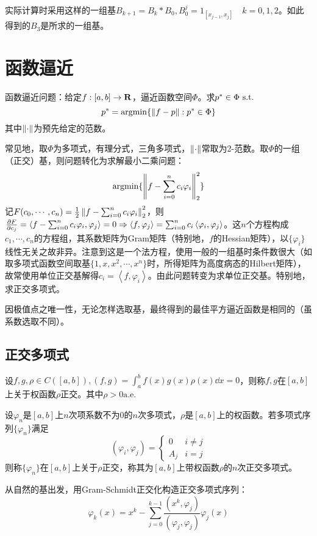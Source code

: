 \documentclass{ctexart}
\begin{document}
实际计算时采用这样的一组基$B_{k+1}=B_k*B_0,B_0^j=1_{[x_{j-1},x_j]}\quad k=0,1,2$。如此得到的$B_3$是所求的一组基。

\section{函数逼近}
函数逼近问题：给定$f:[a,b]\to\mathbf{R}$，逼近函数空间$\Phi$。求$p^*\in \Phi\text{ s.t. }$
\[p^*=\mathrm{argmin}\{\left\|f-p \right\|:p^*\in\Phi\}\]
其中$\left\|\cdot \right\|$为预先给定的范数。

常见地，取$\Phi$为多项式，有理分式，三角多项式，$\left\|\cdot \right\|$常取为2-范数。取$\Phi$的一组（正交）基，则问题转化为求解最小二乘问题：
\[\mathrm{argmin}\{\left\|f-\sum_{i=0}^n c_i\varphi_i \right\|_2^2\}\]
记$F(c_0,\cdots,c_n)=\frac{1}{2}\left\|f-\sum_{i=0}^n c_i\varphi_i \right\|_2^2$，则$\frac{\partial F}{\partial c_j}=\left<f-\sum_{i=0}^n c_i\varphi_i,\varphi_j\right>=0\Rightarrow \left<f,\varphi_j\right>=\sum_{i=0}^n c_i\left<\varphi_i,\varphi_j\right>$。这$n$个方程构成$c_1,\cdots,c_n$的方程组，其系数矩阵为Gram矩阵（特别地，$f$的Hessian矩阵），以$\{\varphi_i\}$线性无关之故非异。注意到这是一个法方程，使用一般的一组基时条件数很大（如取多项式函数空间取基$\{1,x,x^2,\cdots,x^n\}$时，所得矩阵为高度病态的Hilbert矩阵），故常使用单位正交基解得$c_i=\left<f,\varphi_i\right>$。由此问题转变为求单位正交基。特别地，求正交多项式。

因极值点之唯一性，无论怎样选取基，最终得到的最佳平方逼近函数是相同的（虽系数选取不同）。

\subsection{正交多项式}
\begin{Def}
设$f,g,\rho\in C([a,b]),(f,g)=\int_a^b f(x)g(x)\rho(x)\dd x=0$，则称$f,g$在$[a,b]$上关于权函数$\rho$正交。其中$\rho> 0 \mathrm{a.e.}$
\end{Def}

\begin{Def}
设$\varphi_n$是$[a,b]$上$n$次项系数不为0的$n$次多项式，$\rho$是$[a,b]$上的权函数。若多项式序列$\{\varphi_n\}$满足
\[(\varphi_i,\varphi_j)=\begin{cases}0 & i\neq j\\A_j & i=j\end{cases}\]
则称$\{\varphi_n\}$在$[a,b]$上关于$\rho$正交，称其为$[a,b]$上带权函数$\rho$的$n$次正交多项式。
\end{Def}

从自然的基出发，用Gram-Schmidt正交化构造正交多项式序列：
\[\varphi_k(x)=x^k-\sum_{j=0}^{k-1}\frac{(x^k,\varphi_j)}{(\varphi_j,\varphi_j)}\varphi_j(x)\]
\end{document}
